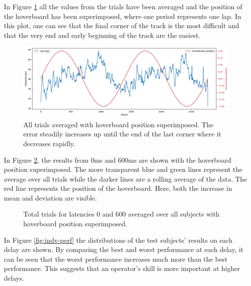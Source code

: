 \documentclass[nofilelist]{cslthse-msc}
\begin{document}
In Figure \ref{fig:hoverboard-pos} all the values from the trials have been averaged and the position of the hoverboard has been superimposed, where one period represents one lap. In this plot, one can see that the final corner of the track is the most difficult and that the very end and early beginning of the track are the easiest. 

\begin{figure}[!hbt]
   \centering
   \includegraphics[scale=0.4]{images/hoverboard-pos.png} 
   \caption{All trials averaged with hoverboard position superimposed. The error steadily increases up until the end of the last corner where it decreases rapidly.}
   \label{fig:hoverboard-pos}
\end{figure}

In Figure \ref{fig:0vs600}, the results from 0ms and 600ms are shown with the hoverboard position superimposed. The more transparent blue and green lines represent the average over all trials while the darker lines are a rolling average of the data. The red line represents the position of the hoverboard. Here, both the increase in mean and deviation are visible. 

\begin{figure}[!hbt]
   \centering
   \caption{Total trials for latencies 0 and 600 averaged over all subjects with hoverboard position superimposed.}
   \label{fig:0vs600}
\end{figure}

In Figure \ref{fig:indv-perf} the distributions of the test subjects' results on each delay are shown. By comparing the best and worst performance at each delay, it can be seen that the worst performance increases much more than the best performance. This suggests that an operator's skill is more important at higher delays. 
\end{document}
